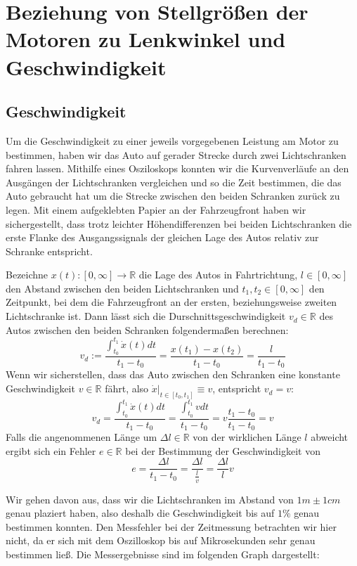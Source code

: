 \section{Beziehung von Stellgrößen der Motoren zu Lenkwinkel und Geschwindigkeit}
\subsection{Geschwindigkeit}
Um die Geschwindigkeit zu einer jeweils vorgegebenen Leistung am Motor zu bestimmen, haben wir das Auto auf gerader Strecke durch zwei Lichtschranken fahren lassen. Mithilfe eines Osziloskops konnten wir die Kurvenverläufe an den Ausgängen der Lichtschranken vergleichen und so die Zeit bestimmen, die das Auto gebraucht hat um die Strecke zwischen den beiden Schranken zurück zu legen. Mit einem aufgeklebten Papier an der Fahrzeugfront haben wir sichergestellt, dass trotz leichter Höhendifferenzen bei beiden Lichtschranken die erste Flanke des Ausgangssignals der gleichen Lage des Autos relativ zur Schranke entspricht.

Bezeichne $x(t): [0,\infty]\rightarrow \mathbb{R}$ die Lage des Autos in Fahrtrichtung, $l\in[0,\infty]$ den Abstand zwischen den beiden Lichtschranken und $t_1, t_2\in [0,\infty]$ den Zeitpunkt, bei dem die Fahrzeugfront an der ersten, beziehungsweise zweiten Lichtschranke ist. Dann lässt sich die Durschnittsgeschwindigkeit $v_d\in\mathbb{R}$ des Autos zwischen den beiden Schranken folgendermaßen berechnen:
\begin{equation*}
v_d := \frac{\int_{t_0}^{t_1}{\dot x(t) dt}}{t_1-t_0}=\frac{x(t_1)-x(t_2)}{t_1-t_0}=\frac{l}{t_1-t_0}
\end{equation*}
Wenn wir sicherstellen, dass das Auto zwischen den Schranken eine konstante Geschwindigkeit $v\in\mathbb{R}$ fährt, also $\dot x\vert_{t\in[t_0,t_1]}\equiv v$, entspricht $v_d=v$:
\begin{equation*}
v_d = \frac{\int_{t_0}^{t_1}{\dot x(t) dt}}{t_1-t_0} = \frac{\int_{t_0}^{t_1}{v dt}}{t_1-t_0}=v\frac{t_1-t_0}{t_1-t_0}=v
\end{equation*}
Falls die angenommenen Länge um $\Delta l\in\mathbb{R}$ von der wirklichen Länge $l$ abweicht ergibt sich ein Fehler $e\in \mathbb{R}$ bei der Bestimmung der Geschwindigkeit von
\begin{equation*}
	e = \frac{\Delta l}{t_1-t_0} = \frac{\Delta l}{\frac{l}{v}} = \frac{\Delta l}{l}v
\end{equation*}

Wir gehen davon aus, dass wir die Lichtschranken im Abstand von $1m\pm1cm$ genau plaziert haben, also deshalb die Geschwindigkeit bis auf $1\%$ genau bestimmen konnten. Den Messfehler bei der Zeitmessung betrachten wir hier nicht, da er sich mit dem Oszilloskop bis auf Mikrosekunden sehr genau bestimmen ließ. Die Messergebnisse sind im folgenden Graph dargestellt:


